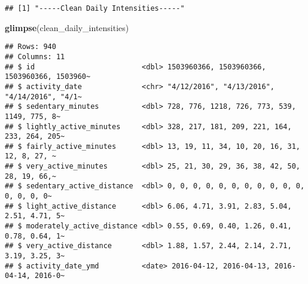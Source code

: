 \documentclass[
]{article}
\newenvironment{Shaded}{\begin{snugshade}}{\end{snugshade}}
\newcommand{\AttributeTok}[1]{\textcolor[rgb]{0.13,0.29,0.53}{#1}}
\newcommand{\CommentTok}[1]{\textcolor[rgb]{0.56,0.35,0.01}{\textit{#1}}}
\newcommand{\FunctionTok}[1]{\textcolor[rgb]{0.13,0.29,0.53}{\textbf{#1}}}
\newcommand{\NormalTok}[1]{#1}
\newcommand{\OtherTok}[1]{\textcolor[rgb]{0.56,0.35,0.01}{#1}}
\newcommand{\SpecialCharTok}[1]{\textcolor[rgb]{0.81,0.36,0.00}{\textbf{#1}}}
\newcommand{\StringTok}[1]{\textcolor[rgb]{0.31,0.60,0.02}{#1}}
\begin{document}
\begin{Shaded}
\end{Shaded}

\begin{verbatim}
## [1] "-----Clean Daily Intensities-----"
\end{verbatim}

\begin{Shaded}
\begin{Highlighting}[]
\FunctionTok{glimpse}\NormalTok{(clean\_daily\_intensities)}
\end{Highlighting}
\end{Shaded}

\begin{verbatim}
## Rows: 940
## Columns: 11
## $ id                         <dbl> 1503960366, 1503960366, 1503960366, 1503960~
## $ activity_date              <chr> "4/12/2016", "4/13/2016", "4/14/2016", "4/1~
## $ sedentary_minutes          <dbl> 728, 776, 1218, 726, 773, 539, 1149, 775, 8~
## $ lightly_active_minutes     <dbl> 328, 217, 181, 209, 221, 164, 233, 264, 205~
## $ fairly_active_minutes      <dbl> 13, 19, 11, 34, 10, 20, 16, 31, 12, 8, 27, ~
## $ very_active_minutes        <dbl> 25, 21, 30, 29, 36, 38, 42, 50, 28, 19, 66,~
## $ sedentary_active_distance  <dbl> 0, 0, 0, 0, 0, 0, 0, 0, 0, 0, 0, 0, 0, 0, 0~
## $ light_active_distance      <dbl> 6.06, 4.71, 3.91, 2.83, 5.04, 2.51, 4.71, 5~
## $ moderately_active_distance <dbl> 0.55, 0.69, 0.40, 1.26, 0.41, 0.78, 0.64, 1~
## $ very_active_distance       <dbl> 1.88, 1.57, 2.44, 2.14, 2.71, 3.19, 3.25, 3~
## $ activity_date_ymd          <date> 2016-04-12, 2016-04-13, 2016-04-14, 2016-0~
\end{verbatim}
\end{document}
